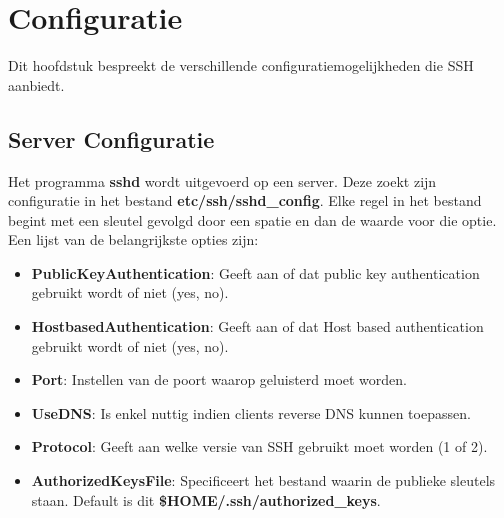 \documentclass{report}
\begin{document}
	\chapter{Configuratie}
	Dit hoofdstuk bespreekt de verschillende configuratiemogelijkheden die SSH aanbiedt.
	\section{Server Configuratie}
	Het programma \textbf{sshd} wordt uitgevoerd op een server. Deze zoekt zijn configuratie in het bestand \textbf{etc/ssh/sshd\_config}. Elke regel in het bestand begint met een sleutel gevolgd door een spatie en dan de waarde voor die optie. Een lijst van de belangrijkste opties zijn: 
	\begin{itemize}
		\item \textbf{PublicKeyAuthentication}: Geeft aan of dat public key authentication gebruikt wordt of niet (yes, no).
		\item \textbf{HostbasedAuthentication}: Geeft aan of dat Host based authentication gebruikt wordt of niet (yes, no).
		\item \textbf{Port}: Instellen van de poort waarop geluisterd moet worden.
		\item \textbf{UseDNS}: Is enkel nuttig indien clients reverse DNS kunnen toepassen.
		\item \textbf{Protocol}: Geeft aan welke versie van SSH gebruikt moet worden (1 of 2).
		\item \textbf{AuthorizedKeysFile}: Specificeert het bestand waarin de publieke sleutels staan. Default is dit \textbf{\$HOME/.ssh/authorized\_keys}.
	\end{itemize}
	
\end{document}
